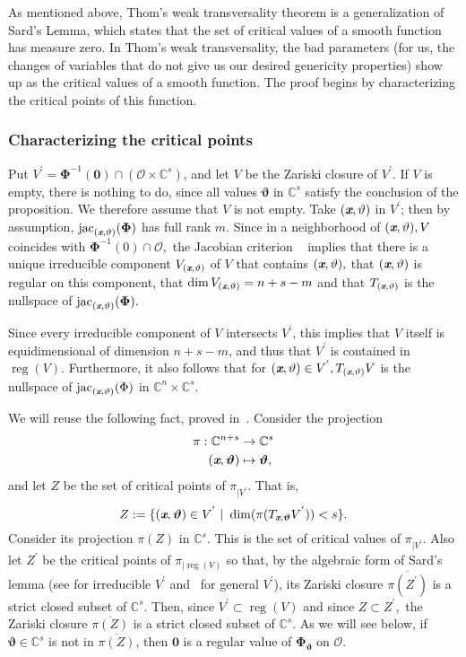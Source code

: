 \documentclass[a4paper]{article}
\def\sO{\mathscr{O}}
\def\thetab{\bm{\vartheta}}
\def\xb{\textit{\textbf{x}}}
\def\vt{\vartheta}
\DeclareMathOperator{\jac}{jac}
\DeclareMathOperator{\reg}{reg}
\def\dt{s}
\def\C{\mathbb{C}}
\begin{document}
As mentioned above, Thom’s weak transversality theorem is a generalization of Sard’s Lemma, which states that the set of critical values of a smooth function has measure zero. In Thom’s weak transversality, the bad parameters (for us, the changes of variables that do not give us our desired genericity properties) show up as the critical values of a smooth function. The proof begins by characterizing the critical points of this function.

\subsubsection{Characterizing the critical points}
    Put $V^{'} = \bm\Phi^{-1}(\bm 0) \cap (\sO \times \C^s)$, and let $V$ be the Zariski closure of $V^{'}.$ If $V$ is empty, there is nothing to do, since all values $\thetab$ in $\C^\dt$ satisfy the conclusion of the proposition. We therefore assume that $V$ is not empty. Take $(\xb, \vt)$ in $V^{'}$; then by assumption, $\jac_{(\xb,\vt)}({\bm \Phi})$ has full rank $m$. Since in a neighborhood of $(\xb,\vt), V$ coincides with ${\bm \Phi}^{-1}(0) \cap \sO,$ the Jacobian criterion ~\cite[Corollary 16.20]{ECA} implies that there is a unique irreducible component $V_{(\xb,\vt)}$ of $V$ that contains $(\xb,\vt),$ that $(\xb,\vt)$ is regular on this component, that $\dim V_{(\xb,\vt)}=n+s-m$ and that $T_{(\xb,\vt)}$ is the nullspace of $\jac_{(\xb,\vt)}({\bm \Phi}).$
    
    Since every irreducible component of $V$ intersects $V^{'}$, this implies that $V$ itself is equidimensional of dimension $n+s-m$, and thus that $V^{'}$ is contained in $\reg (V)$. Furthermore, it also follows that for $(\xb,\vt) \in V^{'}, T_{(\xb,\vt)}V$ is the nullspace of $\jac_{(\xb,\vt)}(\Phi)$ in $\C^n \times \C^s.$  
    
    We will reuse the following fact, proved in~\cite{TWT}.  Consider the
    projection 
    \begin{align*}
    \pi: \C^{n+\dt} &\rightarrow\C^{\dt} \\
    (\xb, \thetab)&\mapsto\thetab, 
    \end{align*}
    and let $Z$ be the set of critical points of
    $\pi_{|V^{'}}$. That is,  \[Z := \{(\xb,\bm \vt) \in V^{'}~|~\dim (\pi(T_{\xb,\bm \vt}V^{'}))<s\}.\] Consider its projection $\pi(Z)$ in $\C^s$. This is
    the set of critical values of $\pi_{|V^{'}}$. Also let $Z^{'}$ be the critical points of $\pi_{|\reg(V)}$ so that, by the algebraic form
    of Sard's lemma (see \cite[Theorem~3.7]{Mumford76} for irreducible $V^{'}$
    and~\cite[Proposition~B.2]{TWT} for general $V^{'}$), its Zariski closure
    $\overline{\pi(Z^{'})}$ is a strict closed subset of $\C^s$. Then, since $V^{'} \subset \reg(V)$ and since $Z \subset Z^{'},$ the Zariski closure $\overline{\pi(Z)}$ is a strict closed subset of $\C^s$.  As we will
    see below, if $\thetab \in \C^{\dt}$ is not in $\overline{\pi(Z)}$,
    then $\bm 0$ is a regular value of $\bm\Phi_{\thetab}$ on $\sO.$
    
\end{document}
